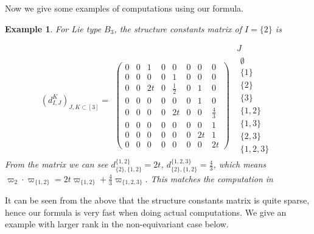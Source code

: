 \documentclass[11pt, letterpaper]{amsart}
\numberwithin{equation}{section}
\newtheorem{eg}[theorem]{Example}
\begin{document}
Now we give some examples of computations using our formula.

\begin{eg}
    For Lie type $B_3$, the structure constants matrix of $I=\{2\}$ is
    
    \[\left(d_{I, J}^K\right)_{J, K \subset[3]}=\begin{array}{cc}
    &J\\
    \begin{pmatrix}
  0  & 0  & 1 &  0 &  0  & 0  & 0  & 0\\
  0  & 0  & 0 &  0 &  1  & 0  & 0  & 0\\
  0  & 0  & 2t &  0 & \frac{1}{2} &  0   &1  & 0\\
  0  & 0  & 0 &  0 &  0 &  0 &  1 &  0\\
  0  & 0  & 0 &  0 &  2t  & 0 &  0& \frac{4}{3}\\
  0  & 0  & 0 &  0 &  0  & 0   &0  & 1\\
  0  & 0  & 0 &  0 &  0  & 0  & 2t & 1\\
  0  & 0  & 0 &  0 &  0  & 0 &  0 &  2t
    \end{pmatrix}
    &
    \begin{array}{c}
         \emptyset\\ \{1\} \\\{2\} \\\{3\}\\\{1,2\}\\\{1,3\}\\\{2,3\}\\\{1,2,3\}     
    \end{array}
    \end{array}
    \]
    From the matrix we can see $d_{\{2\},\{1,2\}}^{\{1,2\}}=2t$, $d_{\{2\},\{1,2\}}^{\{1,2,3\}}=\frac{4}{3}$, which means $\varpi_2\cdot \varpi_{\{1, 2\}}=2t\varpi_{\{1, 2\}}+\frac{4}{3}\varpi_{\{1, 2, 3\}}.$ This matches the computation in \cite[Example 6.8]{goldin2021equivariant}
\end{eg}

It can be seen from the above that the structure constants matrix is quite sparse, hence our formula is very fast when doing actual computations. We give an example with larger rank in the non-equivariant case below.
\end{document}

